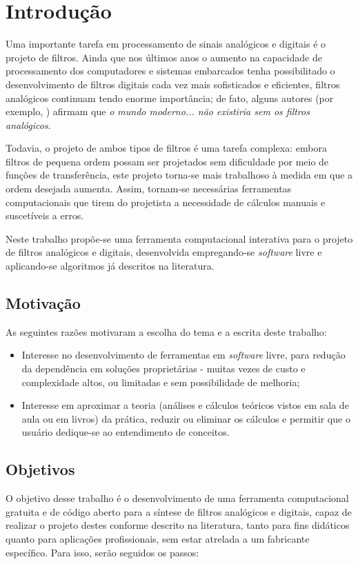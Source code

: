 \chapter{Introdução}

Uma importante tarefa em processamento de sinais analógicos e digitais é o projeto de filtros. Ainda que nos últimos anos o aumento na capacidade de processamento dos computadores e sistemas embarcados tenha possibilitado o desenvolvimento de filtros digitais cada vez mais sofisticados e eficientes, filtros analógicos continuam tendo enorme importância; de fato, alguns autores (por exemplo, \cite{paarmann}) afirmam que \textit{o mundo moderno... não existiria sem os filtros analógicos}.

Todavia, o projeto de ambos tipos de filtros é uma tarefa complexa: embora filtros de pequena ordem possam ser projetados sem dificuldade por meio de funções de transferência, este projeto torna-se mais trabalhoso à medida em que a ordem desejada aumenta. Assim, tornam-se necessárias ferramentas computacionais que tirem do projetista a necessidade de cálculos manuais e suscetíveis a erros.

Neste trabalho propõe-se uma ferramenta computacional interativa para o projeto de filtros analógicos e digitais, desenvolvida empregando-se \textit{software} livre e aplicando-se algoritmos já descritos na literatura. 

\section{Motivação}
As seguintes razões motivaram a escolha do tema e a escrita deste trabalho:
\begin{itemize}
\item Interesse no desenvolvimento de ferramentas em \textit{software} livre, para redução da dependência em soluções proprietárias - muitas vezes de custo e complexidade altos, ou limitadas e sem possibilidade de melhoria;
\item Interesse em aproximar a teoria (análises e cálculos teóricos vistos em sala de aula ou em livros) da prática, reduzir ou eliminar os cálculos e permitir que o usuário dedique-se ao entendimento de conceitos.
\end{itemize}

\section{Objetivos}

O objetivo desse trabalho é o desenvolvimento de uma ferramenta computacional gratuita e de código aberto para a síntese de filtros analógicos e digitais, capaz de realizar o projeto destes conforme descrito na literatura, tanto para fins didáticos quanto para aplicações profissionais, sem estar atrelada a um fabricante específico. Para isso, serão seguidos os passos:

